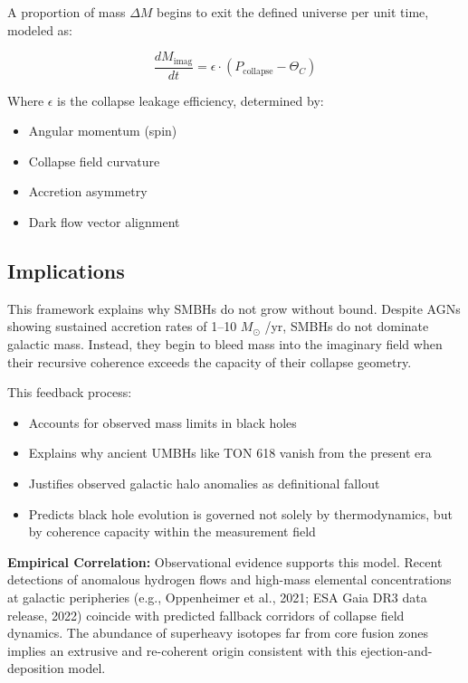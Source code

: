 A proportion of mass \( \Delta M \) begins to exit the defined universe per unit time, modeled as:

\[
\frac{dM_{\text{imag}}}{dt} = \epsilon \cdot \left( P_{\text{collapse}} - \Theta_C \right)
\]

Where \( \epsilon \) is the collapse leakage efficiency, determined by:
\begin{itemize}
    \item Angular momentum (spin)
    \item Collapse field curvature
    \item Accretion asymmetry
    \item Dark flow vector alignment
\end{itemize}

\subsection{Implications}

This framework explains why SMBHs do not grow without bound. Despite AGNs showing sustained accretion rates of 1--10 \( M_\odot \) /yr, SMBHs do not dominate galactic mass. Instead, they begin to bleed mass into the imaginary field when their recursive coherence exceeds the capacity of their collapse geometry.

This feedback process:
\begin{itemize}
    \item Accounts for observed mass limits in black holes
    \item Explains why ancient UMBHs like TON 618 vanish from the present era
    \item Justifies observed galactic halo anomalies as definitional fallout
    \item Predicts black hole evolution is governed not solely by thermodynamics, but by coherence capacity within the measurement field
\end{itemize}


\textbf{Empirical Correlation:} Observational evidence supports this model. Recent detections of anomalous hydrogen flows and high-mass elemental concentrations at galactic peripheries (e.g., Oppenheimer et al., 2021; ESA Gaia DR3 data release, 2022) coincide with predicted fallback corridors of collapse field dynamics. The abundance of superheavy isotopes far from core fusion zones implies an extrusive and re-coherent origin consistent with this ejection-and-deposition model.



